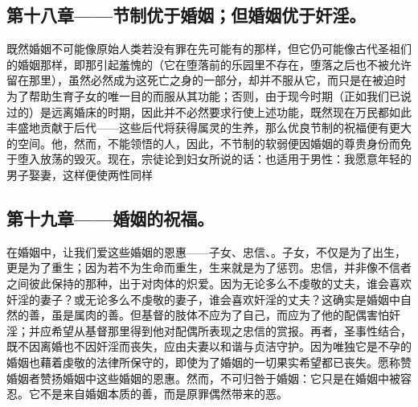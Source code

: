 
\subsection{第十八章——节制优于婚姻；但婚姻优于奸淫。}

既然婚姻不可能像原始人类若没有罪在先可能有的那样，但它仍可能像古代圣祖们的婚姻那样，即那引起羞愧的（它在堕落前的乐园里不存在，堕落之后也不被允许留在那里），虽然必然成为这死亡之身的一部分，却并不服从它，而只是在被迫时为了帮助生育子女的唯一目的而服从其功能；否则，由于现今时期（正如我们已说过的）是远离婚床的时期，因此并不必然要求行使上述功能，既然现在万民都如此丰盛地贡献于后代——这些后代将获得属灵的生养，那么优良节制的祝福便有更大的空间。他，然而，不能领悟的人，因此，不节制的软弱便因婚姻的尊贵身份而免于堕入放荡的毁灭。现在，宗徒论到妇女所说的话：也适用于男性：我愿意年轻的男子娶妻，这样便使两性同样\par


\subsection{第十九章——婚姻的祝福。}

在婚姻中，让我们爱这些婚姻的恩惠——子女、忠信、。子女，不仅是为了出生，更是为了重生；因为若不为生命而重生，生来就是为了惩罚。忠信，并非像不信者之间彼此保持的那种，出于对肉体的炽爱。因为无论多么不虔敬的丈夫，谁会喜欢奸淫的妻子？或无论多么不虔敬的妻子，谁会喜欢奸淫的丈夫？这确实是婚姻中自然的善，虽是属肉的善。但基督的肢体不应为了自己，而应为了他的配偶害怕奸淫；并应希望从基督那里得到他对配偶所表现之忠信的赏报。再者，圣事性结合，既不因离婚也不因奸淫而丧失，应由夫妻以和谐与贞洁守护。因为唯独它是不孕的婚姻也藉着虔敬的法律所保守的，即使为了婚姻的一切果实希望都已丧失。愿称赞婚姻者赞扬婚姻中这些婚姻的恩惠。然而，不可归咎于婚姻：它只是在婚姻中被容忍。它不是来自婚姻本质的善，而是原罪偶然带来的恶。\par

